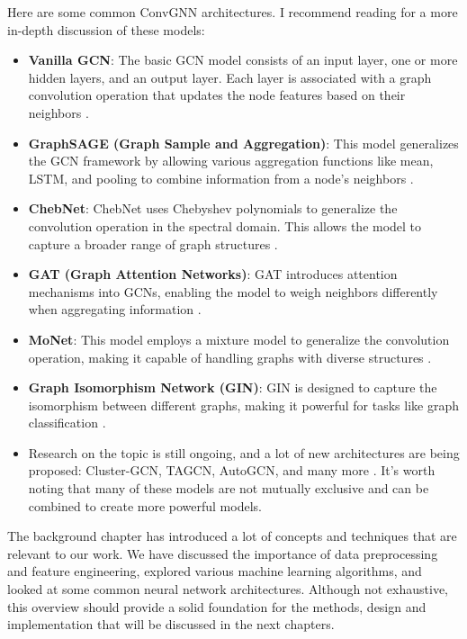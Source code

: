 
    Here are some common ConvGNN architectures. I recommend reading  \cite{GCNAutoFiltering22} for a more in-depth discussion of these models:

    \begin{itemize}
        \item \textbf{Vanilla GCN}: The basic GCN model consists of an input layer, one or more hidden layers, and an output layer. Each layer is associated with a graph convolution operation that updates the node features based on their neighbors \cite{KG22}.
        
        \item \textbf{GraphSAGE (Graph Sample and Aggregation)}: This model generalizes the GCN framework by allowing various aggregation functions like mean, LSTM, and pooling to combine information from a node's neighbors \cite{GraphSAGE17}.
        
        \item \textbf{ChebNet}: ChebNet uses Chebyshev polynomials to generalize the convolution operation in the spectral domain. This allows the model to capture a broader range of graph structures \cite{GNNComprehensiveSurvey20}.
        
        \item \textbf{GAT (Graph Attention Networks)}: GAT introduces attention mechanisms into GCNs, enabling the model to weigh neighbors differently when aggregating information \cite{GAT17}.
        
        \item \textbf{MoNet}: This model employs a mixture model to generalize the convolution operation, making it capable of handling graphs with diverse structures \cite{MoNet17}.
        
        \item \textbf{Graph Isomorphism Network (GIN)}: GIN is designed to capture the isomorphism between different graphs, making it powerful for tasks like graph classification \cite{GCNAutoFiltering22}.
        
        \item Research on the topic is still ongoing, and a lot of new architectures are being proposed: Cluster-GCN, TAGCN, AutoGCN, and many more \cite{GCNAutoFiltering22}. It's worth noting that many of these models are not mutually exclusive and can be combined to create more powerful models.
    \end{itemize}

    The background chapter has introduced a lot of concepts and techniques that are relevant to our work. We have discussed the importance of data preprocessing and feature engineering, explored various machine learning algorithms, and looked at some common neural network architectures. Although not exhaustive, this overview should provide a solid foundation for the methods, design and implementation that will be discussed in the next chapters.
